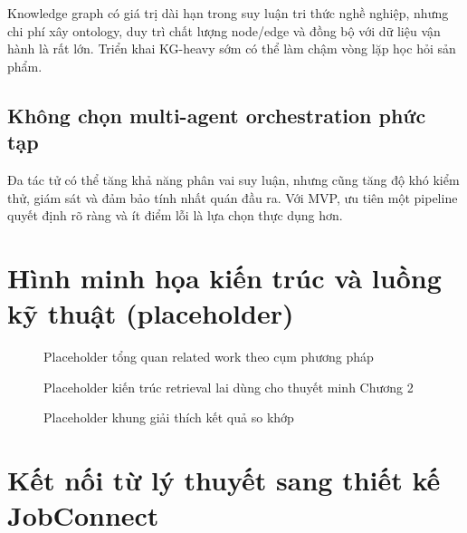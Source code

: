 Knowledge graph có giá trị dài hạn trong suy luận tri thức nghề nghiệp, nhưng chi phí xây ontology, duy trì chất lượng node/edge và đồng bộ với dữ liệu vận hành là rất lớn. Triển khai KG-heavy sớm có thể làm chậm vòng lặp học hỏi sản phẩm.

\subsection{Không chọn multi-agent orchestration phức tạp}

Đa tác tử có thể tăng khả năng phân vai suy luận, nhưng cũng tăng độ khó kiểm thử, giám sát và đảm bảo tính nhất quán đầu ra. Với MVP, ưu tiên một pipeline quyết định rõ ràng và ít điểm lỗi là lựa chọn thực dụng hơn.

\section{Hình minh họa kiến trúc và luồng kỹ thuật (placeholder)}

\begin{figure}[H]
\centering
{}
\caption{Placeholder tổng quan related work theo cụm phương pháp}
\label{fig:related-work-map-placeholder}
\end{figure}

\begin{figure}[H]
\centering
{}
\caption{Placeholder kiến trúc retrieval lai dùng cho thuyết minh Chương 2}
\label{fig:hybrid-retrieval-placeholder}
\end{figure}

\begin{figure}[H]
\centering
{}
\caption{Placeholder khung giải thích kết quả so khớp}
\label{fig:explainability-placeholder}
\end{figure}

\section{Kết nối từ lý thuyết sang thiết kế JobConnect}

